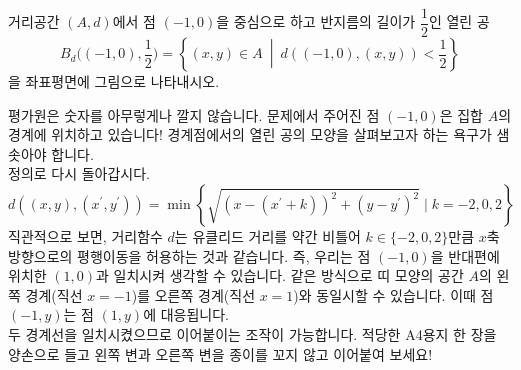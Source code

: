 \documentclass[serif]{beamer}
\begin{document}
\begin{frame}
    \begin{hint}
        거리공간 $(A,d)$에서 점 $(-1,0)$을 중심으로 하고 반지름의 길이가 $\dfrac{1}{2}$인 열린 공
        \[
            B_d\biggl((-1,0),\frac{1}{2}\biggr)=\left\{(x,y)\in A~\middle\vert~d((-1,0),(x,y))<\frac{1}{2}\right\}
        \]
        을 좌표평면에 그림으로 나타내시오.
    \end{hint}
    평가원은 숫자를 아무렇게나 깔지 않습니다. 문제에서 주어진 점 $(-1,0)$은 집합 $A$의 경계에 위치하고 있습니다! 경계점에서의 열린 공의 모양을 살펴보고자 하는 욕구가 샘솟아야 합니다. \\
    정의로 다시 돌아갑시다.
    \[
        d((x,y),(x^\prime,y^\prime))=\min\left\{\sqrt{(x-(x^\prime+k))^2+(y-y^\prime)^2}\mid k=-2,0,2\right\}
    \]
    직관적으로 보면, 거리함수 $d$는 유클리드 거리를 약간 비틀어 $k\in\{-2,0,2\}$만큼 $x$축 방향으로의 평행이동을 허용하는 것과 같습니다. 즉, 우리는 점 $(-1,0)$을 반대편에 위치한 $(1,0)$과 일치시켜 생각할 수 있습니다.
    같은 방식으로 띠 모양의 공간 $A$의 왼쪽 경계(직선 $x=-1$)를 오른쪽 경계(직선 $x=1$)와 동일시할 수 있습니다. 이때 점 $(-1, y)$는 점 $(1,y)$에 대응됩니다. \\
    두 경계선을 일치시켰으므로 이어붙이는 조작이 가능합니다. 적당한 A4용지 한 장을 양손으로 들고 왼쪽 변과 오른쪽 변을 종이를 꼬지 않고 이어붙여 보세요!
\end{frame}
\end{document}
